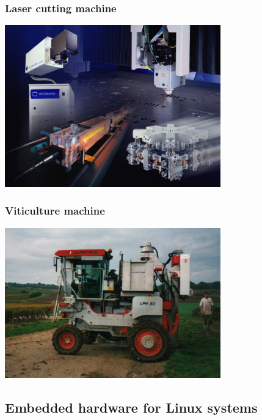 \begin{frame}
\frametitle{Laser cutting machine}
  \begin{center}
    \includegraphics[width=0.7\textwidth]{slides/sysdev-intro/laser-cutting-machine.jpg}
  \end{center}
\end{frame}

\begin{frame}
\frametitle{Viticulture machine}
  \begin{center}
    \includegraphics[width=0.7\textwidth]{slides/sysdev-intro/viticulture-machine.jpg}
  \end{center}
\end{frame}

\subsection{Embedded hardware for Linux systems}

